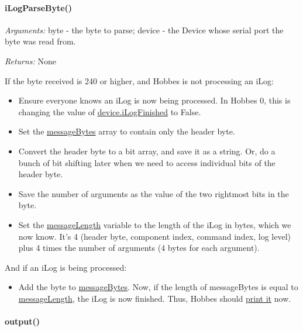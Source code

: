 \documentclass[12pt,letterpaper]{article}
\begin{document}
%
%
\paragraph{iLogParseByte()}
\label{4.6.1.1}

\emph{Arguments:} byte - the byte to parse; device - the Device whose serial port the byte was read from.

\emph{Returns:} None

If the byte received is 240 or higher, and Hobbes is not processing an iLog:

\begin{itemize}

\item Ensure everyone knows an iLog is now being processed. In Hobbes 0, this is changing the value of \hyperref[4.3.2.2.18]{device.iLogFinished} to False.

\item Set the \hyperref[4.3.2.2.21]{messageBytes} array to contain only the header byte.

\item Convert the header byte to a bit array, and save it as a string. Or, do a bunch of bit shifting later when we need to access individual bits of the header byte.

\item Save the number of arguments as the value of the two rightmost bits in the byte.

\item Set the \hyperref[4.3.2.2.22]{messageLength} variable to the length of the iLog in bytes, which we now know. It's 4 (header byte, component index, command index, log level) plus 4 times the number of arguments (4 bytes for each argument).

\end{itemize}

And if an iLog is being processed:

\begin{itemize}

\item Add the byte to \hyperref[4.3.2.2.21]{messageBytes}. Now, if the length of messageBytes is equal to \hyperref[4.3.2.2.22]{messageLength}, the iLog is now finished. Thus, Hobbes should \hyperref[4.6.1.2]{print it} now.

\end{itemize}



%
%
\paragraph{output()}
\label{4.6.1.2}
\end{document}

